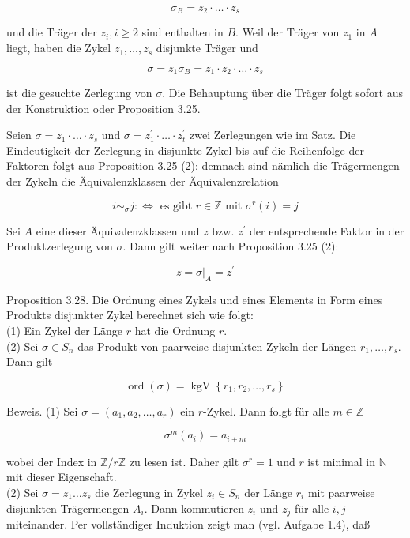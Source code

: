 \documentclass[10pt, letterpaper]{article}
\begin{document}
$$
\sigma_{B}=z_{2} \cdot \ldots \cdot z_{s}
$$

und die Träger der $z_{i}, i \geq 2$ sind enthalten in $B$. Weil der Träger von $z_{1}$ in $A$ liegt, haben die Zykel $z_{1}, \ldots, z_{s}$ disjunkte Träger und

$$
\sigma=z_{1} \sigma_{B}=z_{1} \cdot z_{2} \cdot \ldots \cdot z_{s}
$$

ist die gesuchte Zerlegung von $\sigma$. Die Behauptung über die Träger folgt sofort aus der Konstruktion oder Proposition 3.25.

Seien $\sigma=z_{1} \cdot \ldots \cdot z_{s}$ und $\sigma=z_{1}^{\prime} \cdot \ldots \cdot z_{t}^{\prime}$ zwei Zerlegungen wie im Satz. Die Eindeutigkeit der Zerlegung in disjunkte Zykel bis auf die Reihenfolge der Faktoren folgt aus Proposition 3.25 (2): demnach sind nämlich die Trägermengen der Zykeln die Äquivalenzklassen der Äquivalenzrelation

$$
i \sim_{\sigma} j: \Longleftrightarrow \text { es gibt } r \in \mathbb{Z} \text { mit } \sigma^{r}(i)=j
$$

Sei $A$ eine dieser Äquivalenzklassen und $z$ bzw. $z^{\prime}$ der entsprechende Faktor in der Produktzerlegung von $\sigma$. Dann gilt weiter nach Proposition 3.25 (2):

$$
z=\left.\sigma\right|_{A}=z^{\prime}
$$

Proposition 3.28. Die Ordnung eines Zykels und eines Elements in Form eines Produkts disjunkter Zykel berechnet sich wie folgt:\\
(1) Ein Zykel der Länge $r$ hat die Ordnung $r$.\\
(2) Sei $\sigma \in S_{n}$ das Produkt von paarweise disjunkten Zykeln der Längen $r_{1}, \ldots, r_{s}$. Dann gilt

$$
\operatorname{ord}(\sigma)=\operatorname{kgV}\left\{r_{1}, r_{2}, \ldots, r_{s}\right\}
$$

Beweis. (1) Sei $\sigma=\left(a_{1}, a_{2}, \ldots, a_{r}\right)$ ein $r$-Zykel. Dann folgt für alle $m \in \mathbb{Z}$

$$
\sigma^{m}\left(a_{i}\right)=a_{i+m}
$$

wobei der Index in $\mathbb{Z} / r \mathbb{Z}$ zu lesen ist. Daher gilt $\sigma^{r}=1$ und $r$ ist minimal in $\mathbb{N}$ mit dieser Eigenschaft.\\
(2) Sei $\sigma=z_{1} \ldots z_{s}$ die Zerlegung in Zykel $z_{i} \in S_{n}$ der Länge $r_{i}$ mit paarweise disjunkten Trägermengen $A_{i}$. Dann kommutieren $z_{i}$ und $z_{j}$ für alle $i, j$ miteinander. Per vollständiger Induktion zeigt man (vgl. Aufgabe 1.4), daß
\end{document}
